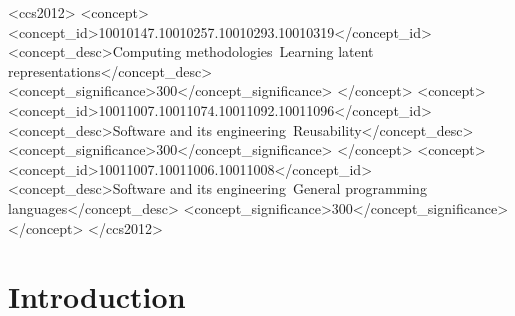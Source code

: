 \documentclass[sigconf]{acmart}
\begin{document}
\begin{CCSXML}
<ccs2012>
   <concept>
       <concept_id>10010147.10010257.10010293.10010319</concept_id>
       <concept_desc>Computing methodologies~Learning latent representations</concept_desc>
       <concept_significance>300</concept_significance>
       </concept>
   <concept>
       <concept_id>10011007.10011074.10011092.10011096</concept_id>
       <concept_desc>Software and its engineering~Reusability</concept_desc>
       <concept_significance>300</concept_significance>
       </concept>
   <concept>
       <concept_id>10011007.10011006.10011008</concept_id>
       <concept_desc>Software and its engineering~General programming languages</concept_desc>
       <concept_significance>300</concept_significance>
       </concept>
 </ccs2012>
\end{CCSXML}




\maketitle

\section{Introduction}
\end{document}

